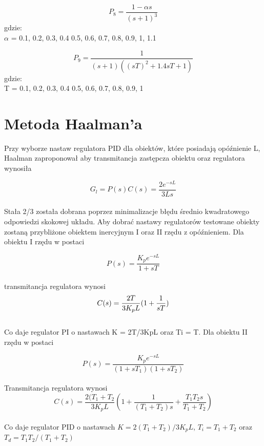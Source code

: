 \documentclass[10pt,a4paper]{article}
\begin{document}
\begin{equation}
P_8 = \frac{1 - \alpha s}{{(s + 1)}^3}
\end{equation}
gdzie:\\
$\alpha$ = 0.1, 0.2, 0.3, 0.4 0.5, 0.6, 0.7, 0.8, 0.9, 1,  1.1

\begin{equation}
P_9 = \frac{1}{(s + 1)({(sT)}^2 + 1.4sT + 1)}
\end{equation}
gdzie:\\
T = 0.1, 0.2, 0.3, 0.4 0.5, 0.6, 0.7, 0.8, 0.9, 1
\bigskip 
\bigskip



\section{Metoda Haalman'a}

Przy wyborze nastaw regulatora PID dla obiektów, które posiadają opóźnienie L, Haalman zaproponował aby transmitancja zastępcza obiektu oraz regulatora wynosiła 

\begin{equation}
G_l = P(s)C(s) = \frac{2e^{-sL}}{3Ls}
\end{equation}\\
Stała 2/3 została dobrana poprzez minimalizacje błędu średnio kwadratowego odpowiedzi skokowej układu. Aby  dobrać nastawy regulatorów  testowane obiekty zostaną przybliżone obiektem inercyjnym I oraz II rzędu z opóźnieniem. Dla obiektu I rzędu w postaci 

\begin{equation}
P(s) = \frac{K_p e^{-sL}}{1 + sT}
\end{equation}\\
transmitancja regulatora wynosi
\begin{equation}\\
C(s) = \frac{2T}{3K_p L}(1 + \frac{1}{sT})
\end{equation}\\
Co daje regulator PI o nastawach K = 2T/3KpL oraz Ti = T. Dla obiektu II rzędu w postaci

\begin{equation}
P(s) = \frac{K_p e^{-sL}}{(1 + sT_1)(1+ sT_2)}
\end{equation}\\
Transmitancja regulatora wynosi
\begin{equation}
C(s) = \frac{2(T_1 + T_2}{3K_p L}(1 + \frac{1}{(T_1 + T_2)s} + \frac{T_1 T_2 s}{T_1 + T_2})
\end{equation}\\
Co daje regulator PID o nastawach $K = 2(T_1 + T_2)/3K_p L$, $T_i = T_1 + T_2$ oraz $T_d = T_1 T_2 / (T_1  + T_2)$
\end{document}
